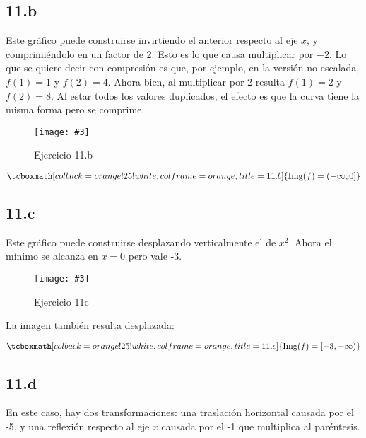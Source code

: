 \documentclass{article}
\newcommand{\hresult}[2]{\tcboxmath[colback=orange!25!white,colframe=orange, title=#1] {#2} }
\newcommand{\figurex}[4]{\begin{figure}[ht] \caption{#1} \texttt{[image: \#3]} \centering \label{#4}\end{figure}}
\newcommand{\figurexnp}[4]{\afterpage{\figurex{#1}{#2}{#3}{#4}}}
\begin{document}
\subsection*{11.b}
\label{subsec:11.b}

Este gráfico puede construirse invirtiendo el anterior respecto al eje $x$, y comprimiéndolo en un factor de 2. Esto es lo que causa multiplicar por $-2$. Lo que se quiere decir con compresión es que, por ejemplo, en la versión no escalada, $f(1) = 1$ y $f(2) = 4$. Ahora bien, al multiplicar por 2 resulta $f(1) = 2$ y $f(2) = 8$. Al estar todos los valores duplicados, el efecto es que la curva tiene la misma forma pero se comprime.

\figurex{Ejercicio 11.b}{1.3}{../img/guide_01/ex_11b.png}{fig:11b}

\begin{equation}
\hresult{11.b}{ \mathop{\text{Img}}(f) = (-\infty, 0] }
\end{equation}

\subsection*{11.c}
\label{subsec:11.c}

Este gráfico puede construirse desplazando verticalmente el de $x^2$. Ahora el mínimo se alcanza en $x = 0$ pero vale -3.

\newpage

\figurex{Ejercicio 11c}{1.3}{../img/guide_01/ex_11c.png}{fig:11c}

La imagen también resulta desplazada:

\begin{equation}
\hresult{11.c}{ \mathop{\text{Img}}(f) = [-3, +\infty) }
\end{equation}

\subsection*{11.d}
\label{subsec:11.d}

En este caso, hay dos transformaciones: una traslación horizontal causada por el -5, y una reflexión respecto al eje $x$ causada por el -1 que multiplica al paréntesis.

\figurexnp{Ejercicio 11.d}{1.3}{../img/guide_01/ex_11d.png}{fig:11d}
\end{document}

